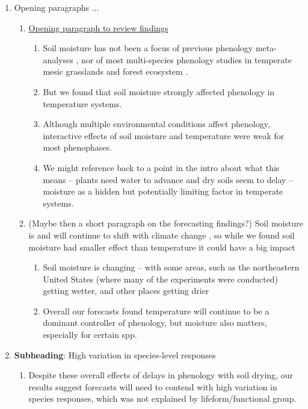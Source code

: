 \documentclass[11pt,letter]{article}
\begin{document}

\renewcommand{\refname}{\CHead{}}

\begin{enumerate}
\item Opening paragraphs ...
\begin{enumerate}
\item  \underline{Opening paragraph to review findings}
\begin{enumerate}
\item Soil moisture has not been a focus of previous phenology meta-analyses \cite[e.g.,][]{wolkovich2012}, nor of most multi-species phenology studies in temperate mesic grasslands and forest ecosystem \cite[e.g.,][]{Vitass2021}.
\item But we found that soil moisture strongly affected phenology in temperature systems. 
\item Although multiple environmental conditions affect phenology, interactive effects of soil moisture and temperature were weak for most phenophases. 
\item We might reference back to a point in the intro about what this means -- plants need water to advance and dry soils seem to delay -- moisture as a hidden but potentially limiting factor in temperate systems. 
\end{enumerate}
\item (Maybe then a short paragraph on the forecasting findings?) Soil moisture is and will continue to shift with climate change \citep{berg2017}, so while we found soil moisture had smaller effect than temperature it could have a big impact
\begin{enumerate}
\item Soil moisture is changing -- with some areas, such as the northeastern United States (where many of the experiments were conducted) getting wetter, and other places getting drier \citep{berg2017}
\item Overall our forecasts found temperature will continue to be a dominant controller of phenology, but moisture also matters, especially for certain spp. 
\end{enumerate}
\end{enumerate}
\item {\bf Subheading}: High variation in species-level responses
\begin{enumerate}
\item Despite these overall effects of delays in phenology with soil drying, our results suggest forecasts will need to contend with high variation in species responses, which was not explained by lifeform/functional group.

\end{enumerate}
\end{enumerate}
\end{document}
